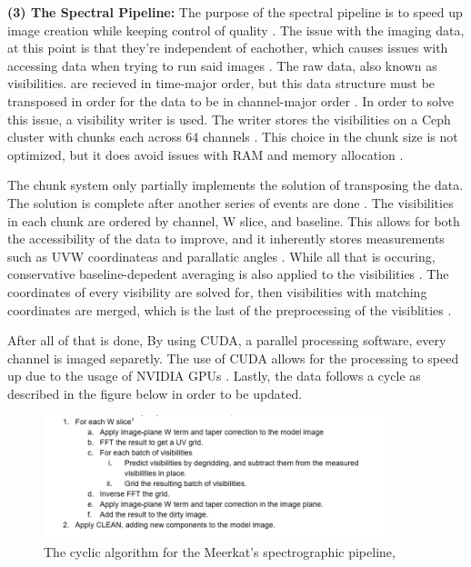 \documentclass[preprint,linenumbers, longauthor]{aastex631}
\begin{document}
 \textbf{(3) The Spectral Pipeline:} 
The purpose of the spectral pipeline is to speed up image creation while keeping control of quality \citep{ratcliffeSDPPipelinesOverview2021}. 
The issue with the imaging data, at this point is that they're independent of eachother, which causes issues with accessing data when trying to run said images \citep{ratcliffeSDPPipelinesOverview2021}. The raw data, also known as visibilities. are recieved in time-major order, but this data structure must be transposed in order for the data to be in channel-major order \citep{ratcliffeSDPPipelinesOverview2021}.
In order to solve this issue, a visibility writer is used. The writer stores the visibilities on a Ceph cluster with chunks each across 64 channels \citep{ratcliffeSDPPipelinesOverview2021}. This choice in the chunk size is not optimized, but it does avoid issues with RAM and memory allocation \citep{ratcliffeSDPPipelinesOverview2021}.

The chunk system only partially implements the solution of transposing the data. The solution is complete after another series of events are done \citep{ratcliffeSDPPipelinesOverview2021}. The visibilities in each chunk are ordered by channel, W slice, and baseline. This allows for both the accessibility of the data to improve, and it inherently stores measurements such as UVW coordinateas and parallatic angles \citep{ratcliffeSDPPipelinesOverview2021}.
While all that is occuring, conservative baseline-depedent averaging is also applied to the visibilities \citep{ratcliffeSDPPipelinesOverview2021}. The coordinates of every visibility are solved for, then visibilities with matching coordinates are merged, which is the last of the preprocessing of the visiblities \citep{ratcliffeSDPPipelinesOverview2021}.

After all of that is done, By using CUDA, a parallel processing software, every channel is imaged separetly. The use of CUDA allows for the processing to speed up due to the usage of NVIDIA GPUs \citep{ratcliffeSDPPipelinesOverview2021}. 
Lastly, the data follows a cycle as described in the figure below in order to be updated. 

 \begin{figure}[h!]
  \centering
  \includegraphics[width=0.9\textwidth]{Meerkat_Spec_pipeline.png}
  \caption{The cyclic algorithm for the Meerkat's spectrographic pipeline, \citep{ratcliffeSDPPipelinesOverview2021}}
  \label{fig:Spec_pipeline}
\end{figure}
\end{document}
